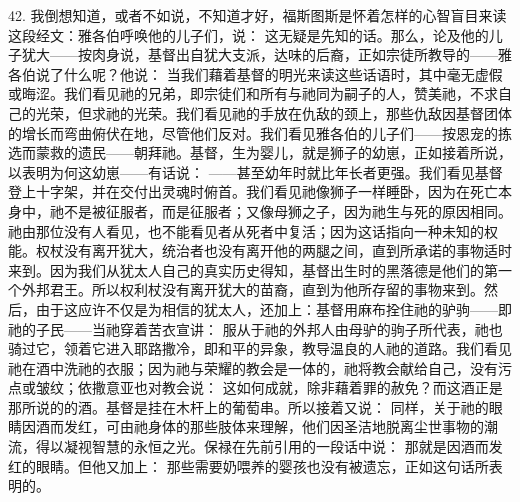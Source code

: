 42. 我倒想知道，或者不如说，不知道才好，福斯图斯是怀着怎样的心智盲目来读这段经文：雅各伯呼唤他的儿子们，说： 这无疑是先知的话。那么，论及他的儿子犹大——按肉身说，基督出自犹大支派，达味的后裔，正如宗徒所教导的——雅各伯说了什么呢？他说： 当我们藉着基督的明光来读这些话语时，其中毫无虚假或晦涩。我们看见祂的兄弟，即宗徒们和所有与祂同为嗣子的人，赞美祂，不求自己的光荣，但求祂的光荣。我们看见祂的手放在仇敌的颈上，那些仇敌因基督团体的增长而弯曲俯伏在地，尽管他们反对。我们看见雅各伯的儿子们——按恩宠的拣选而蒙救的遗民——朝拜祂。基督，生为婴儿，就是狮子的幼崽，正如接着所说，以表明为何这幼崽——有话说： ——甚至幼年时就比年长者更强。我们看见基督登上十字架，并在交付出灵魂时俯首。我们看见祂像狮子一样睡卧，因为在死亡本身中，祂不是被征服者，而是征服者；又像母狮之子，因为祂生与死的原因相同。祂由那位没有人看见，也不能看见者从死者中复活；因为这话指向一种未知的权能。权杖没有离开犹大，统治者也没有离开他的两腿之间，直到所承诺的事物适时来到。因为我们从犹太人自己的真实历史得知，基督出生时的黑落德是他们的第一个外邦君王。所以权利杖没有离开犹大的苗裔，直到为他所存留的事物来到。然后，由于这应许不仅是为相信的犹太人，还加上：基督用麻布拴住祂的驴驹——即祂的子民——当祂穿着苦衣宣讲： 服从于祂的外邦人由母驴的驹子所代表，祂也骑过它，领着它进入耶路撒冷，即和平的异象，教导温良的人祂的道路。我们看见祂在酒中洗祂的衣服；因为祂与荣耀的教会是一体的，祂将教会献给自己，没有污点或皱纹；依撒意亚也对教会说：  这如何成就，除非藉着罪的赦免？而这酒正是那所说的的酒。基督是挂在木杆上的葡萄串。所以接着又说： 同样，关于祂的眼睛因酒而发红，可由祂身体的那些肢体来理解，他们因圣洁地脱离尘世事物的潮流，得以凝视智慧的永恒之光。保禄在先前引用的一段话中说： 那就是因酒而发红的眼睛。但他又加上： 那些需要奶喂养的婴孩也没有被遗忘，正如这句话所表明的。\par

